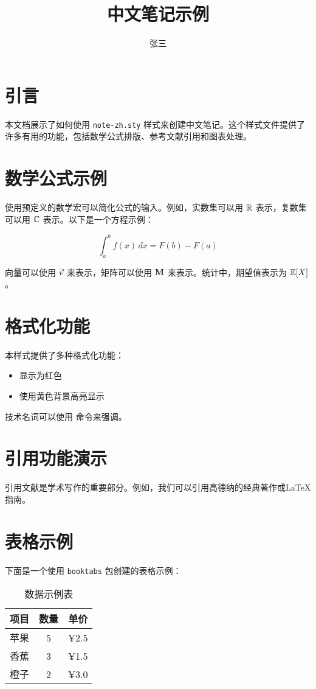 \documentclass{article}
\title{中文笔记示例}
\author{张三}
\begin{document}
\maketitle

\section{引言}
本文档展示了如何使用 \texttt{note-zh.sty} 样式来创建中文笔记。这个样式文件提供了许多有用的功能，包括数学公式排版、参考文献引用和图表处理。

\section{数学公式示例}
使用预定义的数学宏可以简化公式的输入。例如，实数集可以用 $\mathbb{R}$ 表示，复数集可以用 $\mathbb{C}$ 表示。以下是一个方程示例：

\begin{equation}
  \int_{a}^{b} f(x) \, dx = F(b) - F(a)
\end{equation}

向量可以使用 $\vec{v}$ 来表示，矩阵可以使用 $\mathbf{M}$ 来表示。统计中，期望值表示为 $\mathbb{E}[X]$。

\section{格式化功能}
本样式提供了多种格式化功能：

\begin{itemize}
  \item {} 显示为红色
  \item {} 使用黄色背景高亮显示
\end{itemize}

技术名词可以使用  命令来强调。

\section{引用功能演示}
引用文献是学术写作的重要部分。例如，我们可以引用高德纳的经典著作\cite{knuth1984texbook}或LaTeX指南\cite{lamport1994latex}。

\section{表格示例}
下面是一个使用 \texttt{booktabs} 包创建的表格示例：

\begin{table}[htbp]
  \centering
  \caption{数据示例表}
  \begin{tabular}{lcc}
    \toprule
    项目 & 数量 & 单价 \\
    \midrule
    苹果 & 5 & ¥2.5 \\
    香蕉 & 3 & ¥1.5 \\
    橙子 & 2 & ¥3.0 \\
    \bottomrule
  \end{tabular}
\end{table}
\end{document}
